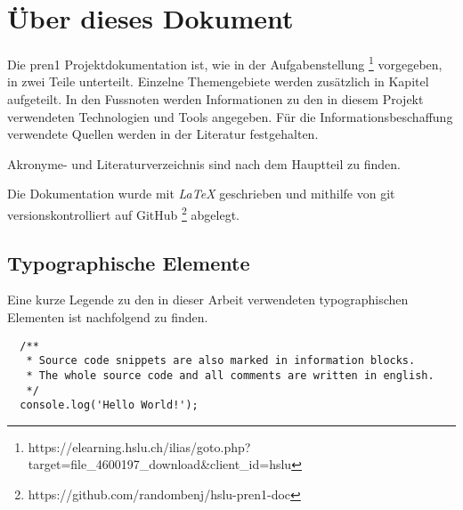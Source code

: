   \section*{Über dieses Dokument}

  Die \acrshort{pren1} Projektdokumentation ist, wie in der Aufgabenstellung \footnote{
    https://elearning.hslu.ch/ilias/goto.php?target=file\_4600197\_download\&client\_id=hslu
  } vorgegeben, in zwei Teile unterteilt.
  Einzelne Themengebiete werden zusätzlich in Kapitel aufgeteilt.
  In den Fussnoten werden Informationen zu den in diesem Projekt verwendeten
  Technologien und Tools angegeben.
  Für die Informationsbeschaffung verwendete Quellen werden in der Literatur
  festgehalten.

Akronyme- und Literaturverzeichnis sind nach dem Hauptteil zu finden.

  Die Dokumentation wurde mit {\it LaTeX} geschrieben und mithilfe von git
  versionskontrolliert auf GitHub \footnote{https://github.com/randombenj/hslu-pren1-doc}
  abgelegt.
  
  \subsection*{Typographische Elemente}

  Eine kurze Legende zu den in dieser Arbeit verwendeten typographischen Elementen
  ist nachfolgend zu finden.


  \begin{verbatim}
  /**
   * Source code snippets are also marked in information blocks.
   * The whole source code and all comments are written in english.
   */
  console.log('Hello World!');
  \end{verbatim}
  
  \newpage 